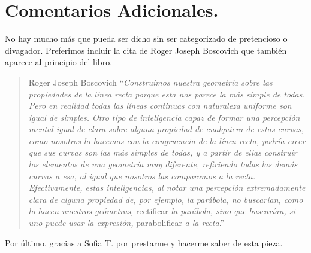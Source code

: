 \section{Comentarios Adicionales.}

No hay mucho más que pueda ser dicho sin ser categorizado de pretencioso o divagador. Preferimos incluir la cita de Roger Joseph Boscovich que también aparece al principio del libro.

\begin{quote}{Roger Joseph Boscovich}
	\enquote{\textit{Construímos nuestra geometría sobre las propiedades de la línea recta porque esta nos parece la más simple de todas. Pero en realidad todas las líneas continuas con naturaleza uniforme son igual de simples. Otro tipo de inteligencia capaz de formar una percepción mental igual de clara sobre alguna propiedad de cualquiera de estas curvas, como nosotros lo hacemos con la congruencia de la línea recta, podría creer que sus curvas son las más simples de todas, y a partir de ellas construir los elementos de una geometría muy diferente, refiriendo todas las demás curvas a esa, al igual que nosotros las comparamos a la recta. Efectivamente, estas inteligencias, al notar una percepción extremadamente clara de alguna propiedad de, por ejemplo, la parábola, no buscarían, como lo hacen nuestros geómetras,} rectificar \textit{la parábola, sino que buscarían, si uno puede usar la expresión,} parabolificar \textit{a la recta}.}
\end{quote}

Por último, gracias a Sofia T. por prestarme y hacerme saber de esta pieza.
